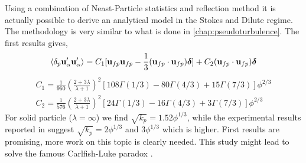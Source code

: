 \begin{enumerate}
    Using a combination of Neast-Particle statistics and reflection method it is actually possible to derive an analytical model in the Stokes and Dilute regime. 
    The methodology is very similar to what is done in \ref{chap:pseudoturbulence}. 
    The first results gives, 
    \begin{equation*}
        \left<\delta_p \textbf{u}_\alpha'\textbf{u}_\alpha'\right>
        = 
        C_1[\textbf{u}_{fp}\textbf{u}_{fp} - \frac{1}{3}(\textbf{u}_{fp}\cdot \textbf{u}_{fp})\bm\delta] 
        + C_2(\textbf{u}_{fp}\cdot \textbf{u}_{fp})\bm\delta
    \end{equation*}
    \begin{align}
      C_1 = \frac{1}{960}\left(\frac{2+3\lambda}{\lambda+1}\right)^2 \left[
        108\Gamma(1/3)
        - 80\Gamma (4/3)
        +15\Gamma(7/3)
      \right]\phi^{2/3}\\
      C_2 = \frac{1}{576}\left(
        \frac{2+3\lambda}{\lambda+1}\right)^2 \left[
        24\Gamma(1/3)
        - 16\Gamma (4/3)
        +3\Gamma(7/3)
      \right]\phi^{2/3}
    \end{align}
    For solid particle ($\lambda=\infty$) we find $\sqrt{k_p} = 1.52\phi^{1/3}$, while the experimental results reported in \citet{guazzelli2011fluctuations} suggest $\sqrt{k_p} = 2\phi^{1/3}$ and $3\phi^{1/3}$ which is higher. 
    First results are promising, more work on this topic is clearly needed.
    This study might lead to solve the famous Carlfish-Luke paradox \citet{caflisch1985variance}. 
\end{enumerate}

